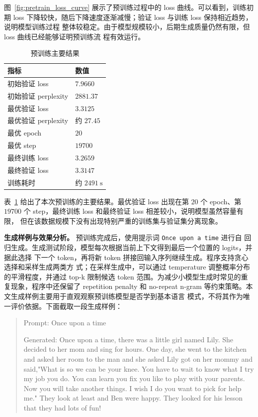 \documentclass[UTF8,a4paper,zihao=-4,fontset=none]{ctexart}
\numberwithin{equation}{section}
\begin{document}
图~\ref{fig:pretrain_loss_curve} 展示了预训练过程中的 loss 曲线。可以看到，训练初期 loss
下降较快，随后下降速度逐渐减慢；验证 loss 与训练 loss 保持相近趋势，说明模型训练过程
整体较稳定。由于模型规模较小，后期生成质量仍然有限，但 loss 曲线已经能够证明预训练流
程有效运行。

\begin{table}[!htbp]
  \centering
  \caption{预训练主要结果}
  \label{tab:pretrain_results}
  \renewcommand{\arraystretch}{1.2}
  \begin{tabular}{ll}
    \toprule
    指标 & 数值 \\
    \midrule
    初始验证 loss & $7.9660$ \\
    初始验证 perplexity & $2881.37$ \\
    最优验证 loss & $3.3125$ \\
    最优验证 perplexity & 约 $27.45$ \\
    最优 epoch & $20$ \\
    最优 step & $19700$ \\
    最终训练 loss & $3.2659$ \\
    最终验证 loss & $3.3147$ \\
    训练耗时 & 约 $2491\ \mathrm{s}$ \\
    \bottomrule
  \end{tabular}
\end{table}

表~\ref{tab:pretrain_results} 给出了本次预训练的主要结果。最优验证 loss 出现在第 $20$ 个
epoch、第 $19700$ 个 step，最终训练 loss 和最终验证 loss 相差较小，说明模型虽然容量有限，
但在该数据规模下没有出现特别严重的训练集与验证集分离现象。

\textbf{生成样例与效果分析。} 预训练完成后，使用提示词 \texttt{Once upon a time} 进行自
回归生成。生成测试阶段，模型每次根据当前上下文得到最后一个位置的 logits，并据此选择
下一个 token，再将新 token 拼接回输入序列继续生成。程序支持贪心选择和采样生成两类方
式；在采样生成中，可以通过 temperature 调整概率分布的平滑程度，并通过 top-k 限制候选
token 范围。为减少小模型生成时常见的重复现象，程序中还保留了 repetition penalty 和
no-repeat n-gram 等约束策略。本文生成样例主要用于直观观察预训练模型是否学到基本语言
模式，不将其作为唯一评价依据。下面截取一段生成样例：
\begin{quote}
\small
Prompt: Once upon a time

Generated: Once upon a time, there was a little girl named Lily. She decided to her mom and sing for hours. One day, she went to the kitchen and asked her room to the man and she asked Lily got on her mommy and said,"What is so we can be your knee. You have to wait to know what I try my job you do. You can learn you fix you like to play with your parents. Now you will take another things. I wish I do you want to pick for help me."
They look at least and Ben were happy. They looked for his lesson that they had lots of fun!
\end{quote}
\end{document}
